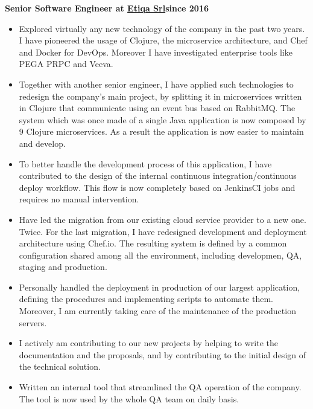 \documentclass[a4paper,sans,10pt]{moderncv} %
\begin{document}
\textbf{Senior Software Engineer at \href{https://www.etiqa.it}{Etiqa Srl}}\hfill\textbf{since 2016}\\
\vspace{-1em}
  \begin{itemize}
  \item Explored virtually any new technology of the company in the past two years.
  I have pioneered the usage of Clojure, the microservice architecture, and Chef and Docker for DevOps.
  Moreover I have investigated enterprise tools like PEGA PRPC and Veeva.
  \item Together with another senior engineer, I have applied such technologies to redesign the company's main project,
  by splitting it in microservices written in Clojure that communicate using an event bus based on RabbitMQ.
  The system which was once made of a single Java application is now composed by 9 Clojure microservices.
  As a result the application is now easier to maintain and develop.
  \item To better handle the development process of this application, I have contributed to the design of the internal
  continuous integration/continuous deploy workflow. This flow is now completely based on JenkinsCI jobs and requires
  no manual intervention.
  \item Have led the migration from our existing cloud service provider to a new one. Twice.
  For the last migration, I have redesigned development and deployment architecture using Chef.io.
  The resulting system is defined by a common configuration shared among all the environment, including developmen, QA, staging and production.
  \item Personally handled the deployment in production of our largest application, defining the procedures and implementing scripts to automate them.
  Moreover, I am currently taking care of the maintenance of the production servers.
  \item I actively am contributing to our new projects by helping to write the documentation and the proposals,
  and by contributing to the initial design of the technical solution.
  \item Written an internal tool that streamlined the QA operation of the company. The tool is now used by the whole QA team on daily basis.
  \end{itemize}
\end{document}
